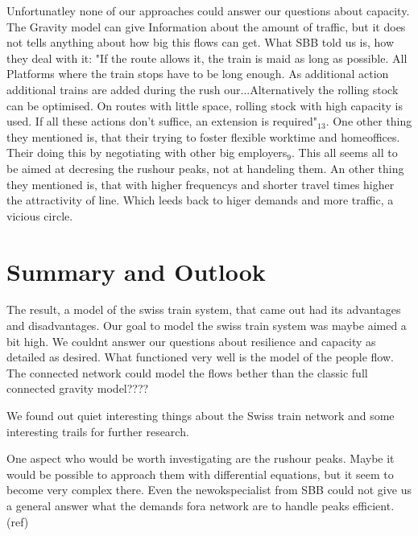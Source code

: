 \documentclass[11pt]{article}
\begin{document}
Unfortunatley none of our approaches could answer our questions about capacity. The Gravity model can give Information about the amount of traffic, but it does not tells anything about how big this flows can get. What SBB told us is, how they deal with it: "If the route allows it, the train is maid as long as possible. All Platforms where the train stops have to be long enough. As additional action additional trains are added during the rush our...Alternatively the rolling stock can be optimised. On routes with little space, rolling stock with high capacity is used. If all these actions don't suffice, an extension is required"$_{13}$. One other thing they mentioned is, that their trying to foster flexible worktime and homeoffices. Their doing this by negotiating with other big employers$_{9}$. This all seems all to be aimed at decresing the rushour peaks, not at handeling them. An other thing they mentioned is, that with higher frequencys and shorter travel times higher the attractivity of line. Which leeds back to higer demands and more traffic, a vicious circle.




\section{Summary and Outlook}

The result, a model of the swiss train system, that came out had its advantages and disadvantages. Our goal to model the swiss train system was maybe aimed a bit high. We couldnt answer our questions about resilience and capacity as detailed as desired. What functioned very well is the model of the people flow. The connected network could model the flows bether than the classic full connected gravity model????\newline 

 

We found out quiet interesting things about the Swiss train network and some interesting trails for further research.\newline

One aspect who would be worth investigating are the rushour peaks. Maybe it would be possible to approach them with differential equations, but it seem to become very complex there. Even the newokspecialist from SBB could not  give us a general answer what the demands fora network are to handle peaks efficient. (ref)
\end{document}
